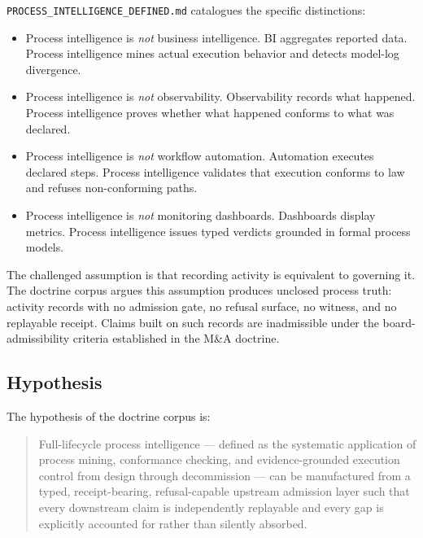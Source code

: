 \texttt{PROCESS\_INTELLIGENCE\_DEFINED.md} catalogues the specific distinctions:

\begin{itemize}
  \item Process intelligence is \emph{not} business intelligence. BI aggregates reported
    data. Process intelligence mines actual execution behavior and detects model-log
    divergence.
  \item Process intelligence is \emph{not} observability. Observability records what
    happened. Process intelligence proves whether what happened conforms to what was declared.
  \item Process intelligence is \emph{not} workflow automation. Automation executes declared
    steps. Process intelligence validates that execution conforms to law and refuses
    non-conforming paths.
  \item Process intelligence is \emph{not} monitoring dashboards. Dashboards display metrics.
    Process intelligence issues typed verdicts grounded in formal process models.
\end{itemize}

The challenged assumption is that recording activity is equivalent to governing it. The
doctrine corpus argues this assumption produces unclosed process truth: activity records with
no admission gate, no refusal surface, no witness, and no replayable receipt. Claims built
on such records are inadmissible under the board-admissibility criteria established in the
M\&A doctrine.

\subsection{Hypothesis}
\label{sec:doctrine-question-hypothesis}

The hypothesis of the doctrine corpus is:

\begin{quote}
Full-lifecycle process intelligence --- defined as the systematic application of process
mining, conformance checking, and evidence-grounded execution control from design through
decommission --- can be manufactured from a typed, receipt-bearing, refusal-capable upstream
admission layer such that every downstream claim is independently replayable and every gap is
explicitly accounted for rather than silently absorbed.
\end{quote}

